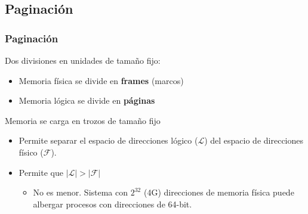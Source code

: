 \documentclass[letter]{beamer}
\begin{document}
\subsection{Paginación}

\begin{frame}
  \frametitle{Paginación}

  Dos divisiones en unidades de tamaño fijo:
  \begin{itemize}
    \item Memoria física se divide en {\bf frames} (marcos)
    \item Memoria lógica se divide en {\bf páginas}
  \end{itemize}
  
  Memoria se carga en trozos de tamaño fijo
  
  \begin{itemize}
    \item Permite separar el espacio de direcciones lógico ($\mathcal{L}$) del espacio de direcciones físico ($\mathcal{F}$).
    \item Permite que $|\mathcal{L}| > |\mathcal{F}|$
      \begin{itemize}
        \item No es menor. Sistema con $2^{32}$ (4G) direcciones de memoria física
              puede albergar procesos con direcciones de 64-bit.
      \end{itemize}
  \end{itemize}
  
\end{frame}
\end{document}
